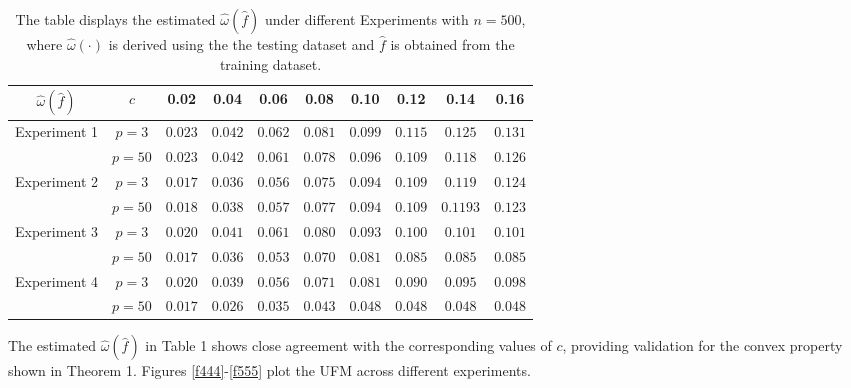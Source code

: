 \documentclass[12pt]{article}
\theoremstyle{plain}
\theoremstyle{definition}
\theoremstyle{remark}
\begin{document}
\begin{table}
\caption{ {The table displays the estimated ${\widehat{\omega}}(\widehat{f})$ under different Experiments with $n=500$, where ${\widehat{\omega}}(\cdot)$ is derived using the the testing dataset and $\widehat{f}$ is obtained from the training dataset.}}
\centering
{\begin{tabular}{cccccccccc}
\toprule
   ${\widehat{\omega}}(\widehat{f})$ &{$c$} &0.02&0.04&0.06&0.08&0.10&0.12&0.14&0.16\\
       \hline
   \multirow{2}{*}{Experiment 1}&   $p=3$ &   $0.023$& $0.042$ &$0.062$& $0.081$&$ 0.099$ &$0.115$& $0.125$ &$0.131$\\
   &  $p=50$ &$0.023$  &$0.042$ &$ 0.061 $& $0.078  $ & $0.096 $ &  $0.109 $ & $0.118 $& $ 0.126 $\\
     \hline
   \multirow{2}{*}{Experiment 2}&   $ p=3  $&   $ 0.017 $&   $0.036 $&  $ 0.056  $& $ 0.075 $&  $ 0.094  $&  $0.109 $& $  0.119 $&  $ 0.124 $\\
   &  $p=50 $ & $0.018  $ & $0.038  $& $ 0.057 $ & $0.077  $ & $0.094  $& $0.109 $ & $0.1193  $ & $0.123 $\\
  \hline
    \multirow{2}{*}{Experiment 3}&   $ p=3  $& $0.020 $&  $ 0.041 $&  $ 0.061 $  &  $0.080 $ & $0.093  $& $ 0.100 $&   $ 0.101 $&  $  0.101$\\
   &  $ p=50 $ & $0.017$ & $0.036 $&  $0.053  $& $0.070  $& $0.081 $&  $0.085 $ & $0.085 $& $0.085 $\\
    \hline
    \multirow{2}{*}{Experiment 4}&   $ p=3 $ & $0.020 $ &  $0.039  $&  $0.056 $& $ 0.071  $& $0.081 $& $0.090 $ & $0.095  $& $0.098 $\\
   &   $p=50 $ & $0.017 $& $0.026  $& $0 .035 $& $0.043 $& $0.048 $&  $0.048  $& $0.048  $& $0.048   $\\
     \bottomrule
\end{tabular}}

\end{table}

 The estimated $\widehat{\omega}(\widehat{f})$ in Table 1 shows close agreement with the corresponding values of $c$, providing validation for the convex property shown in Theorem 1. Figures \ref{f444}-\ref{f555} plot the UFM across different experiments.
\end{document}
